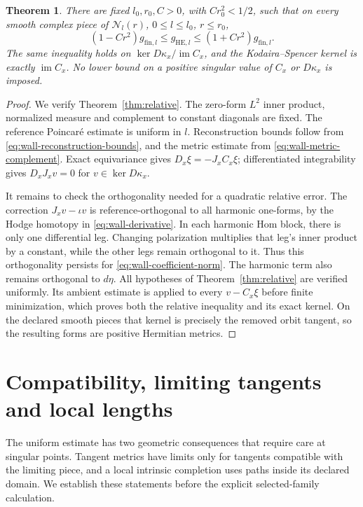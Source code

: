 \documentclass[11pt]{amsart}
\newtheorem{theorem}{Theorem}[section]
\theoremstyle{definition}
\theoremstyle{remark}
\newcommand{\cN}{\mathcal N}
\newcommand{\im}{\operatorname{im}}
\begin{document}
\begin{theorem}\label{thm:wall-metric}
There are fixed $l_0,r_0,C>0$, with $Cr_0^2<1/2$, such that
on every smooth complex piece of $\cN_l(r)$, $0\le l\le l_0$,
$r\le r_0$,
\begin{equation}\label{eq:wall-relative}
 (1-Cr^2)g_{\mathrm{fin},l}\le g_{\mathrm{HE},l}
                      \le(1+Cr^2)g_{\mathrm{fin},l}.
\end{equation}
The same inequality holds on $\ker D\kappa_x/\im C_x$, and the
Kodaira--Spencer kernel is exactly $\im C_x$. No lower bound on a
positive singular value of $C_x$ or $D\kappa_x$ is imposed.
\end{theorem}
\begin{proof}
We verify Theorem~\ref{thm:relative}. The zero-form $L^2$ inner product, normalized
measure and complement to constant diagonals are fixed. The reference
Poincar\'e estimate is uniform in $l$. Reconstruction bounds follow
from \eqref{eq:wall-reconstruction-bounds}, and the metric estimate
from \eqref{eq:wall-metric-complement}. Exact equivariance gives
$D_x\xi=-J_xC_x\xi$; differentiated integrability gives
$D_xJ_xv=0$ for $v\in\ker D\kappa_x$.

It remains to check the orthogonality needed for a quadratic relative
error. The correction $J_xv-\iota v$ is reference-orthogonal to all
harmonic one-forms, by the Hodge homotopy in
\eqref{eq:wall-derivative}. In each harmonic Hom block, there is only
one differential leg. Changing polarization multiplies that leg's
inner product by a constant, while the other legs remain orthogonal
to it. Thus this orthogonality persists for \eqref{eq:wall-coefficient-norm}.
The harmonic term also remains orthogonal to $d\eta$. All hypotheses
of Theorem~\ref{thm:relative} are verified uniformly. Its ambient
estimate is applied to every $v-C_x\xi$ before finite minimization,
which proves both the relative inequality and its exact kernel.
On the declared smooth pieces that kernel is precisely the removed
orbit tangent, so the resulting forms are positive Hermitian metrics.
\end{proof}

\section{Compatibility, limiting tangents and local lengths}\label{sec:limits-lengths}

The uniform estimate has two geometric consequences that require care
at singular points. Tangent metrics have limits only for tangents
compatible with the limiting piece, and a local intrinsic completion
uses paths inside its declared domain. We establish these statements
before the explicit selected-family calculation.
\end{document}
